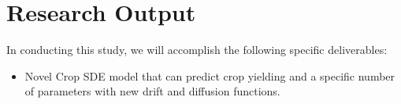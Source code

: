 \section*{Research Output}
In conducting this study, we will accomplish the following specific deliverables:
\begin{itemize}
    \item Novel Crop SDE model that can predict crop yielding and a specific number of parameters with new drift and diffusion 
    functions.
\end{itemize}
